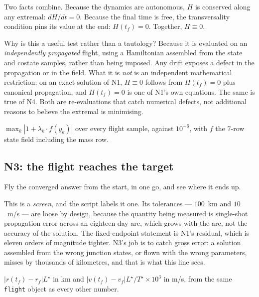 \documentclass[11pt]{article}
\newcommand{\tf}{t_f}\newcommand{\R}{\mathbb{R}}
\newcommand{\code}[1]{\texttt{#1}}
\begin{document}
\begin{intu}
Two facts combine. Because the dynamics are autonomous, $H$ is conserved along
any extremal: $dH/dt = 0$. Because the final time is free, the transversality
condition pins its value at the end: $H(\tf) = 0$. Together, $H \equiv 0$.

Why is this a useful test rather than a tautology? Because it is evaluated on
an \emph{independently propagated} flight, using a Hamiltonian assembled from
the state and costate samples, rather than being imposed. Any drift exposes a
defect in the propagation or in the field. What it is \emph{not} is an
independent mathematical restriction: on an exact solution of N1, $H \equiv 0$
follows from $H(\tf) = 0$ plus canonical propagation, and $H(\tf) = 0$ is one of
N1's own equations. The same is true of N4. Both are re-evaluations that catch
numerical defects, not additional reasons to believe the extremal is
minimising.
\end{intu}

\begin{rig}
$\max_k |1 + \lambda_k \cdot f(y_k)|$ over every flight sample, against
$10^{-6}$, with $f$ the $7$-row state field including the mass row.
\end{rig}

\subsection{N3: the flight reaches the target}\label{sec:N3}

\begin{eli}
Fly the converged answer from the start, in one go, and see where it ends up.
\end{eli}

\begin{intu}
This is a \emph{screen}, and the script labels it one. Its tolerances --- $100$~km
and $10$~m/s --- are loose by design, because the quantity being measured is
single-shot propagation error across an eighteen-day arc, which grows with the
arc, not the accuracy of the solution. The fixed-endpoint statement is N1's
residual, which is eleven orders of magnitude tighter. N3's job is to catch
gross error: a solution assembled from the wrong junction states, or flown with
the wrong parameters, misses by thousands of kilometres, and that is what this
line sees.
\end{intu}

\begin{rig}
$|r(\tf) - r_f| L^\star$ in km and $|v(\tf) - v_f| L^\star/T^\star \times 10^3$
in m/s, from the same \code{flight} object as every other number.
\end{rig}
\end{document}
